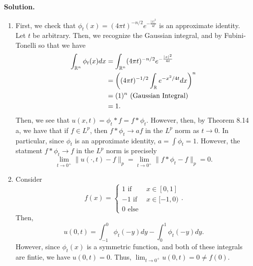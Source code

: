 \documentclass[11pt]{article}
\begin{document}
\begin{enumerate}[leftmargin=*, label=\arabic*.]
    \textbf{Solution.}

    \begin{enumerate}
        \item First, we check that $\phi_t(x) = (4 \pi t)^{ - n / 2} e^{- \frac{|x|^2}{4t}}$ is an approximate identity.
            Let $t$ be arbitrary. Then, we recognize the Gaussian integral, and by Fubini-Tonelli so that we have
            \begin{align*}
                \int_{\mathbb{R}^{n}} \phi_{t}(x) dx &= \int_{\mathbb{R}^{n}} (4\pi t)^{-n / 2} e^{- \frac{|x|^2}{4t}}\\
                                             &= \left( (4 \pi t)^{- 1 / 2} \int_{\mathbb{R}} e^{-x^2 / 4t} dx \right)^{n} \\
                                             &= (1)^{n} \text{ (Gaussian Integral)} \\
                                             &= 1
            .\end{align*}
            Then, we see that $u(x, t) = \phi_t * f = f * \phi_t$.
            However, then, by Theorem 8.14 a, we have that if $f \in L^{p}$, then $f * \phi_t \to af$ in the $L^{p}$ norm as $t \to 0$.
            In particular, since $\phi_t$ is an approximate identity, $a = \int \phi_t = 1$.
            However, the statment $f * \phi_t \to f$ in the $L^{p}$ norm is precisely
            \[
            \lim_{t \to 0^{+}} \|u(\cdot , t) - f\|_p =  \lim_{t \to 0^{+}} \|f * \phi_t - f\|_p = 0 
            .\] 
        \item Consider
        \[
        f(x) = \begin{cases}
                1 \text{ if } & x \in [0, 1] \\
                -1 \text{ if } & x \in [-1, 0) \\
                0 \text{ else } & 
        \end{cases}
        .\] 
        Then,
        \[
        u(0, t) = \int_{-1}^{0} \phi_t(-y)dy - \int_{0}^{1} \phi_t(-y)dy
        .\] 
        However, since $\phi_t(x)$ is a symmetric function, and both of these integrals are fintie, we have $u(0, t) = 0$.
        Thus, $\lim_{t \to 0^{+}}u(0, t) = 0 \neq f(0)$.
    \end{enumerate}

\end{enumerate}
\end{document}

